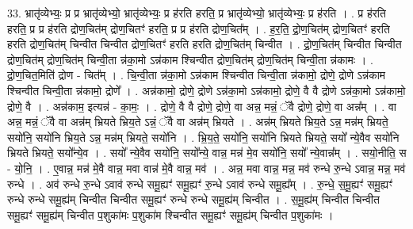 \documentclass[17pt]{extarticle}
\begin{document}
33. भ्रातृ॑व्येभ्यः॒ प्र प्र भ्रातृ॑व्येभ्यो॒ भ्रातृ॑व्येभ्यः॒ प्र ह॑रति हरति॒ प्र भ्रातृ॑व्येभ्यो॒ भ्रातृ॑व्येभ्यः॒ प्र ह॑रति । . प्र ह॑रति हरति॒ प्र प्र ह॑रति द्रोण॒चित॑म् द्रोण॒चितꣳ॑ हरति॒ प्र प्र ह॑रति द्रोण॒चित᳚म् । . ह॒र॒ति॒ द्रो॒ण॒चित॑म् द्रोण॒चितꣳ॑ हरति हरति द्रोण॒चित॑म् चिन्वीत चिन्वीत द्रोण॒चितꣳ॑ हरति हरति द्रोण॒चित॑म् चिन्वीत । . द्रो॒ण॒चित॑म् चिन्वीत चिन्वीत द्रोण॒चित॑म् द्रोण॒चित॑म् चिन्वी॒ता न्न॑का॒मो ऽन्न॑काम श्चिन्वीत द्रोण॒चित॑म् द्रोण॒चित॑म् चिन्वी॒ता न्न॑कामः । . द्रो॒ण॒चित॒मिति॑ द्रोण - चित᳚म् । . चि॒न्वी॒ता न्न॑का॒मो ऽन्न॑काम श्चिन्वीत चिन्वी॒ता न्न॑कामो॒ द्रोणे॒ द्रोणे ऽन्न॑काम श्चिन्वीत चिन्वी॒ता न्न॑कामो॒ द्रोणे᳚ । . अन्न॑कामो॒ द्रोणे॒ द्रोणे ऽन्न॑का॒मो ऽन्न॑कामो॒ द्रोणे॒ वै वै द्रोणे ऽन्न॑का॒मो ऽन्न॑कामो॒ द्रोणे॒ वै । . अन्न॑काम॒ इत्यन्न॑ - का॒मः॒ । . द्रोणे॒ वै वै द्रोणे॒ द्रोणे॒ वा अन्न॒ मन्नं॒ ॅवै द्रोणे॒ द्रोणे॒ वा अन्न᳚म् । . वा अन्न॒ मन्नं॒ ॅवै वा अन्न॑म् भ्रियते भ्रिय॒ते ऽन्नं॒ ॅवै वा अन्न॑म् भ्रियते । . अन्न॑म् भ्रियते भ्रिय॒ते ऽन्न॒ मन्न॑म् भ्रियते॒ सयो॑नि॒ सयो॑नि भ्रिय॒ते ऽन्न॒ मन्न॑म् भ्रियते॒ सयो॑नि । . भ्रि॒य॒ते॒ सयो॑नि॒ सयो॑नि भ्रियते भ्रियते॒ सयो᳚ न्ये॒वैव सयो॑नि भ्रियते भ्रियते॒ सयो᳚न्ये॒व । . सयो᳚ न्ये॒वैव सयो॑नि॒ सयो᳚न्ये॒ वान्न॒ मन्न॑ मे॒व सयो॑नि॒ सयो᳚ न्ये॒वान्न᳚म् । . सयो॒नीति॒ स - यो॒नि॒ । . ए॒वान्न॒ मन्न॑ मे॒वै वान्न॒ मवा वान्न॑ मे॒वै वान्न॒ मव॑ । . अन्न॒ मवा वान्न॒ मन्न॒ मव॑ रुन्धे रु॒न्धे ऽवान्न॒ मन्न॒ मव॑ रुन्धे । . अव॑ रुन्धे रु॒न्धे ऽवाव॑ रुन्धे समू॒ह्यꣳ॑ समू॒ह्यꣳ॑ रु॒न्धे ऽवाव॑ रुन्धे समू॒ह्य᳚म् । . रु॒न्धे॒ स॒मू॒ह्यꣳ॑ समू॒ह्यꣳ॑ रुन्धे रुन्धे समू॒ह्य॑म् चिन्वीत चिन्वीत समू॒ह्यꣳ॑ रुन्धे रुन्धे समू॒ह्य॑म् चिन्वीत । . स॒मू॒ह्य॑म् चिन्वीत चिन्वीत समू॒ह्यꣳ॑ समू॒ह्य॑म् चिन्वीत प॒शुका॑मः प॒शुका॑म श्चिन्वीत समू॒ह्यꣳ॑ समू॒ह्य॑म् चिन्वीत प॒शुका॑मः । \newline
\end{document}
